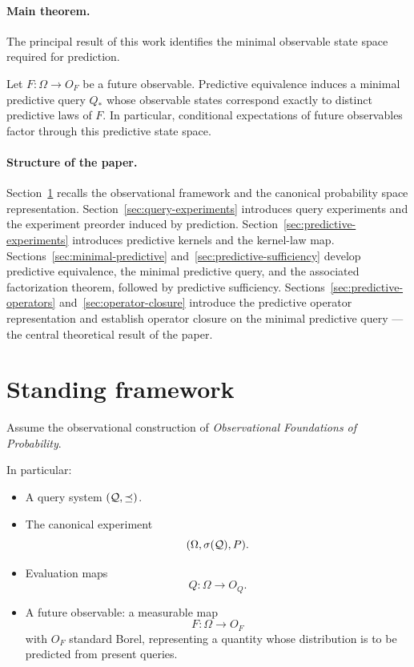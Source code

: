 \paragraph{Main theorem.}
The principal result of this work identifies the minimal observable
state space required for prediction.

\begin{theorem}
Let $F:\Omega\to O_F$ be a future observable.  Predictive equivalence
induces a minimal predictive query $Q_*$ whose observable states
correspond exactly to distinct predictive laws of $F$.  In particular,
conditional expectations of future observables factor through this
predictive state space.
\end{theorem}

\paragraph{Structure of the paper.}
Section~\ref{sec:standing} recalls the observational framework and
the canonical probability space representation.
Section~\ref{sec:query-experiments} introduces query experiments and
the experiment preorder induced by prediction.
Section~\ref{sec:predictive-experiments} introduces predictive kernels
and the kernel-law map.  Sections~\ref{sec:minimal-predictive}
and~\ref{sec:predictive-sufficiency} develop predictive equivalence,
the minimal predictive query, and the associated factorization theorem,
followed by predictive sufficiency.
Sections~\ref{sec:predictive-operators} and~\ref{sec:operator-closure}
introduce the predictive operator representation and establish operator
closure on the minimal predictive query --- the central theoretical
result of the paper.

\section{Standing framework}\label{sec:standing}

Assume the observational construction of
\emph{Observational Foundations of Probability}.

In particular:

\begin{itemize}
\item A query system $(\mathcal{Q},\preceq)$.
\item The canonical experiment
\[
(\Omega,\sigma(\mathcal{Q}),P).
\]
\item Evaluation maps
\[
Q:\Omega\to O_Q.
\]
\item A future observable: a measurable map
\[
F:\Omega\to O_F
\]
with $O_F$ standard Borel, representing a quantity whose distribution
is to be predicted from present queries.
\end{itemize}

